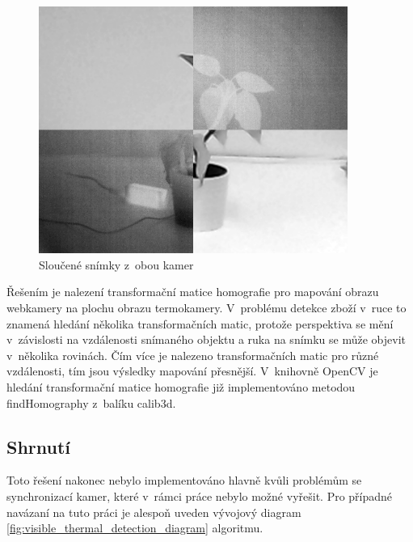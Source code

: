     \begin{figure}[h]
      \centering
      \includegraphics[width=0.9\textwidth]{images/visible_thermal_combined.png}
      \caption{Sloučené snímky z~obou kamer}
      \label{fig:visible_thermal_combined}
    \end{figure} 

    Řešením je nalezení transformační matice homografie pro mapování obrazu webkamery na plochu obrazu termokamery. V~problému detekce zboží v~ruce to znamená hledání několika transformačních matic, protože perspektiva se mění v~závislosti na vzdálenosti snímaného objektu a ruka na snímku se může objevit v~několika rovinách. Čím více je nalezeno transformačních matic pro různé vzdálenosti, tím jsou výsledky mapování přesnější. V~knihovně OpenCV je hledání transformační matice homografie již implementováno metodou findHomography z~balíku calib3d.

	\subsection{Shrnutí}
    Toto řešení nakonec nebylo implementováno hlavně kvůli problémům se synchronizací kamer, které v~rámci práce nebylo možné vyřešit. Pro případné navázaní na tuto práci je alespoň uveden vývojový  diagram \ref{fig:visible_thermal_detection_diagram} algoritmu.

